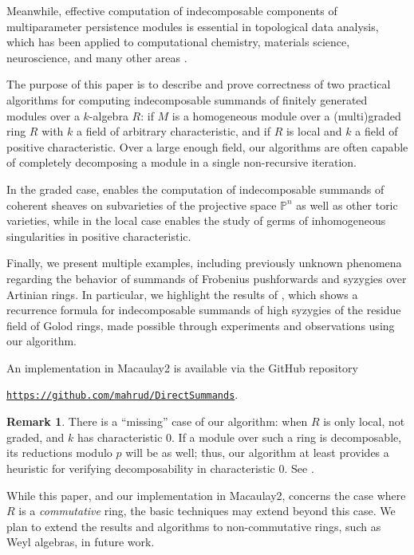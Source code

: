 \documentclass[12pt]{article}
\def\PP{\mathbb P}
\theoremstyle{theorem}
\numberwithin{thm}{section}
\theoremstyle{definition}
\newtheorem{rem}[thm]{Remark}
\begin{document}
Meanwhile, effective computation of indecomposable components of multiparameter persistence modules is essential in topological data analysis, which has been applied to computational chemistry, materials science, neuroscience, and many other areas \cite{BL23}.

The purpose of this paper is to describe and prove correctness of two practical algorithms for computing indecomposable summands of finitely generated modules over a $k$-algebra $R$:  if $M$ is a homogeneous module over a (multi)graded ring $R$ with $k$ a field of arbitrary characteristic, and  if $R$ is local and $k$ a field of positive characteristic. Over a large enough field, our algorithms are often capable of completely decomposing a module in a single non-recursive iteration.

In the graded case,  enables the computation of indecomposable summands of coherent sheaves on subvarieties of the projective space $\PP^n$ as well as other toric varieties, while in the local case  enables the study of germs of inhomogeneous singularities in positive characteristic.

Finally, we present multiple examples, including  previously unknown phenomena regarding the behavior of summands of Frobenius pushforwards and syzygies over Artinian rings. In particular, we highlight the results of \cite{CDE24}, which shows a recurrence formula for indecomposable summands of high syzygies of the residue field of Golod rings, made possible through experiments and observations using our algorithm.

An implementation in Macaulay2 \cite{M2} is available via the GitHub repository \\
\centerline{
  \href{https://github.com/mahrud/DirectSummands}
       {\texttt{https://github.com/mahrud/DirectSummands}}.}


\begin{rem}\label{rem:missing}
  There is a ``missing'' case of our algorithm: when $R$ is only local, not graded, and $k$ has characteristic 0. If a module over such a ring is decomposable, its reductions modulo $p$ will be as well; thus, our algorithm at least provides a heuristic for verifying decomposability in characteristic 0. See .

  While this paper, and our implementation in Macaulay2, concerns the case where $R$ is a \emph{commutative} ring, the basic techniques may extend beyond this case. We plan to extend the results and algorithms to non-commutative rings, such as Weyl algebras, in future work.
\end{rem}
\end{document}
